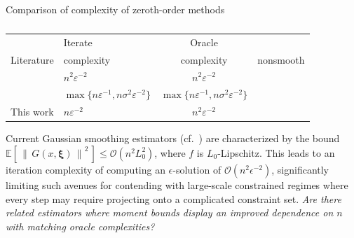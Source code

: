 \documentclass[11pt,reqno]{amsart}
\newcommand{\cmark}{\ding{51}} %
\newcommand{\xmark}{\ding{55}} %
\newcommand{\1}{{\bf 1}}
\newcommand{\2}{{\bf 2}}
\newcommand{\bxi}{\boldsymbol{\xi}}
\numberwithin{equation}{section}
\theoremstyle{remark}
\begin{document}
		\begin{table}[htb]
			\scriptsize
			\caption{}{Comparison of complexity of zeroth-order methods}
			\centering
			\label{tab:complexity}
			\begin{tabular}{ p{4cm} C{2.3cm} c c  }
				\hline
				&  Iterate    & Oracle     &   \\
				Literature &  complexity & complexity &  nonsmooth\\
				\hline
				\citet{nesterov2017random}  &  $n^2\varepsilon^{-2}$   & $n^2\varepsilon^{-2}$    & \cmark  \\
				\hline
				\citet{ghadimi2013stochastic}   &  $\max\{n\varepsilon^{-1},n\sigma^2\varepsilon^{-2}\} $   &  $\max\{n\varepsilon^{-1},n\sigma^2\varepsilon^{-2}\} $ &  \xmark  \\
				\hline
				This work  &  $n\varepsilon^{-2}$   &  $n^2\varepsilon^{-2}$   & \cmark\\
				\hline
			\end{tabular}
		\end{table}
		\begin{tcolorbox}
			 Current Gaussian smoothing estimators (cf.~\cite{nesterov2017random}) are characterized by the bound $\mathbb{E}\left[ \, \left \| \, G(x,\bxi) \, \right\|^2 \, \right] \le \mathcal{O}(n^2 L_0^2)$,  where $f$ is $L_0$-Lipschitz. This leads to an iteration complexity of computing an $\epsilon$-solution of $\mathcal{O}(n^2 \epsilon^{-2})$, significantly limiting such avenues for contending with large-scale constrained regimes where every step may require projecting onto a complicated constraint set. {\em Are there related estimators where moment bounds display an improved dependence on $n$ with matching oracle complexities?}  
		\end{tcolorbox}
		
		
\end{document}
